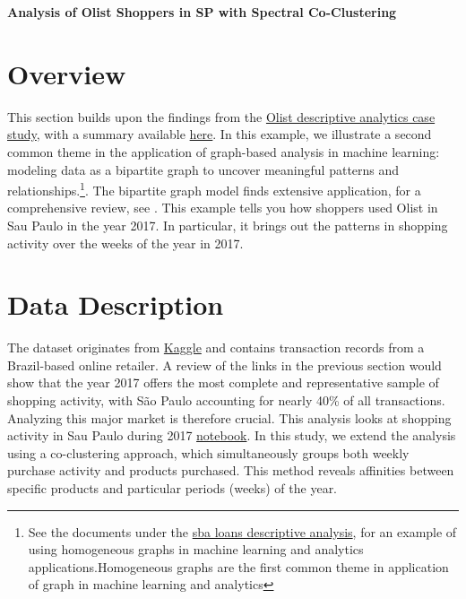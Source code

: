 \documentclass[12pt]{article}
\begin{document}
\begin{tcolorbox}[halign=flush center]
         \textbf{Analysis of Olist Shoppers in SP with Spectral Co-Clustering}
   
 \end{tcolorbox}

 \section{Overview}
This section builds upon the findings from the \href{https://github.com/rajivsam/descriptive_analytics/blob/main/examples/olist_case_study/approach_to_analysis.md}{Olist descriptive analytics case study}, with a summary available \href{https://github.com/rajivsam/descriptive_analytics/blob/main/examples/olist_case_study/picture_summary_SP_2017.md}{here}. In this example, we illustrate a second common theme in the application of graph-based analysis in machine learning: modeling data as a bipartite graph to uncover meaningful patterns and relationships.\footnote{See the documents under the \href{https://github.com/rajivsam/descriptive_analytics/tree/main/examples/sba_7a_loans_analysis}{sba loans descriptive analysis}, for an example of using homogeneous graphs in machine learning and analytics applications.Homogeneous graphs are the first common theme in application of graph in machine learning and analytics}. The bipartite graph model finds extensive application, for a  comprehensive review, see \cite{kunegis2015exploiting}. This example tells you how shoppers used Olist in Sau Paulo in the year 2017. In particular, it brings out the patterns in shopping activity over the weeks of the year in 2017.

 \section{Data Description}
The dataset originates from \href{https://www.kaggle.com/datasets/olistbr/brazilian-ecommerce}{Kaggle} and contains transaction records from a Brazil-based online retailer. A review of the links in the previous section would show that the year 2017 offers the most complete and representative sample of shopping activity, with São Paulo accounting for nearly 40\% of all transactions. Analyzing this major market is therefore crucial. This analysis looks at shopping activity in Sau Paulo during 2017 \href{https://github.com/rajivsam/descriptive_analytics/blob/main/notebooks/cs_analysis_prod_purch_2017.ipynb}{notebook}. In this study, we extend the analysis using a co-clustering approach, which simultaneously groups both weekly purchase activity and products purchased. This method reveals affinities between specific products and particular periods (weeks) of the year.
\end{document}
